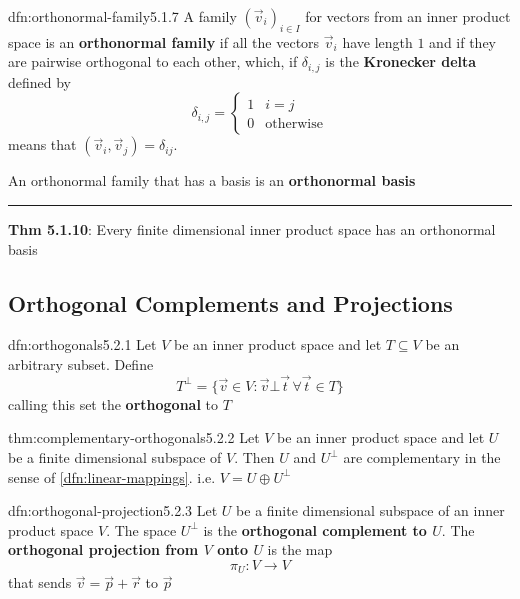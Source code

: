 \documentclass[landscape, 8pt]{extarticle}
\begin{document}
\begin{multicols}{3}
\newpage
\begin{dfn}{dfn:orthonormal-family}{5.1.7}
    A family $(\vec{v}_{i})_{i\in I}$ for vectors from an inner product space is an \textbf{orthonormal family} if all the vectors $\vec{v}_{i}$ have length $1$ and if they are pairwise orthogonal to each other, which, if $\delta_{i,j}$ is the \textbf{Kronecker delta} defined by
    \[\delta_{i, j} = \begin{cases}
        1 & i = j \\
        0 & \text{otherwise}
    \end{cases}\]
    means that $(\vec{v}_{i}, \vec{v}_{j}) = \delta_{ij}$.

    An orthonormal family that has a basis is an \textbf{orthonormal basis}
    
    \noindent\rule{\textwidth}{0.2pt}
    \textbf{Thm 5.1.10}: Every finite dimensional inner product space has an orthonormal basis
\end{dfn}

\subsection{Orthogonal Complements and Projections}

\begin{dfn}{dfn:orthogonals}{5.2.1}
    Let $V$ be an inner product space and let $T \subseteq V$ be an arbitrary subset. Define
    \[T^{\bot} = \{\vec{v} \in V : \vec{v} \bot \vec{t} \, \forall \vec{t}\in T\}\]
    calling this set the \textbf{orthogonal} to $T$
\end{dfn}

\begin{thm}{thm:complementary-orthogonals}{5.2.2}
    Let $V$ be an inner product space and let $U$ be a finite dimensional subspace of $V$. Then $U$ and $U^{\bot}$ are complementary in the sense of \ref{dfn:linear-mappings}. i.e. $V = U \oplus U^{\bot}$
\end{thm}

\begin{dfn}{dfn:orthogonal-projection}{5.2.3}
    Let $U$ be a finite dimensional subspace of an inner product space $V$. The space $U^{\bot}$ is the \textbf{orthogonal complement to $U$}. The \textbf{orthogonal projection from $V$ onto $U$} is the map
    \[\pi_{U} : V \to V\]
    that sends $\vec{v} = \vec{p} + \vec{r}$ to $\vec{p}$


\end{dfn}
\end{multicols}
\end{document}
